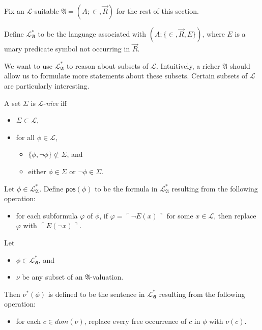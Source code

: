 \documentclass[12pt]{article}
\numberwithin{equation}{section}
\begin{document}
Fix an $\mathcal{L}$-suitable $\mathfrak{A} = (A; \in, \Vec{R})$ for the rest of this section.

\begin{defi}
Define $\mathcal{L}^{*}_{\mathfrak{A}}$ to be the language associated with $(A; \{\in, \Vec{R}, E\})$, where $E$ is a unary predicate symbol not occurring in $\Vec{R}$. 
\end{defi}

We want to use $\mathcal{L}^{*}_{\mathfrak{A}}$ to reason about subsets of $\mathcal{L}$. Intuitively, a richer $\mathfrak{A}$ should allow us to formulate more statements about these subsets. Certain subsets of $\mathcal{L}$ are particularly interesting.

\begin{defi}\label{lnice}
A set $\Sigma$ is $\mathcal{L}$-\emph{nice} iff 
\begin{itemize}
    \item $\Sigma \subset \mathcal{L}$, 
    \item for all $\phi \in \mathcal{L}$, 
    \begin{itemize}[label=$\circ$]
        \item $\{\phi, \neg \phi\} \not\subset \Sigma$, and
        \item either $\phi \in \Sigma$ or $\neg \phi \in \Sigma$.
    \end{itemize} 
\end{itemize}
\end{defi}

\begin{defi}
Let $\phi\in \mathcal{L}^{*}_{\mathfrak{A}}$. Define $\mathsf{pos}(\phi)$ to be the formula in $\mathcal{L}^{*}_{\mathfrak{A}}$ resulting from the following operation:
\begin{itemize}
    \item for each subformula $\varphi$ of $\phi$, if $\varphi = \ulcorner \neg E(x) \urcorner$ for some $x \in \mathcal{L}$, then replace $\varphi$ with $\ulcorner E(\neg x) \urcorner$.
\end{itemize}
\end{defi}

\begin{defi}
Let 
\begin{itemize}
    \item $\phi\in \mathcal{L}^{*}_{\mathfrak{A}}$, and
    \item $\nu$ be any subset of an $\mathfrak{A}$-valuation.
\end{itemize}
Then $\nu^*(\phi)$ is defined to be the sentence in $\mathcal{L}^{*}_{\mathfrak{A}}$ resulting from the following operation:
\begin{itemize}
    \item for each $c \in dom(\nu)$, replace every free occurrence of $c$ in $\phi$ with $\nu(c)$.
\end{itemize}
\end{defi}
\end{document}
